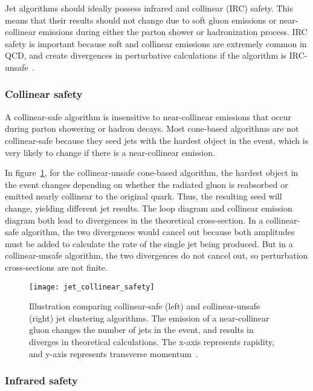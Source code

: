Jet algorithms should ideally possess infrared and collinear (IRC) safety.
This means that their results should not change due to soft gluon emissions or near-collinear emissions during either the parton shower or hadronization process.
IRC safety is important because soft and collinear emissions are extremely common in QCD, and create divergences in perturbative calculations if the algorithm is IRC-unsafe~\cite{jet-jetography}.

\subsubsection{Collinear safety}

A collinear-safe algorithm is insensitive to near-collinear emissions that occur during parton showering or hadron decays.
Most cone-based algorithms are not collinear-safe because they seed jets with the hardest object in the event, which is very likely to change if there is a near-collinear emission.

In figure~\ref{fig:jet_collinear_safety}, for the collinear-unsafe cone-based algorithm, the hardest object in the event changes depending on whether the radiated gluon is reabsorbed or emitted nearly collinear to the original quark.
Thus, the resulting seed will change, yielding different jet results.
The loop diagram and collinear emission diagram both lead to divergences in the theoretical cross-section.
In a collinear-safe algorithm, the two divergences would cancel out because both amplitudes must be added to calculate the rate of the single jet being produced.
But in a collinear-unsafe algorithm, the two divergences do not cancel out, so perturbation cross-sections are not finite.

\begin{figure}[!ht]
    \centering
\texttt{[image: jet\_collinear\_safety]}
\caption{Illustration comparing collinear-safe (left) and collinear-unsafe (right) jet clustering algorithms.
The emission of a near-collinear gluon changes the number of jets in the event, and results in diverges in theoretical calculations.
The x-axis represents rapidity, and y-axis represents transverse momentum~\cite{jet-jetography}.}
\label{fig:jet_collinear_safety}
\end{figure}

\subsubsection{Infrared safety}

